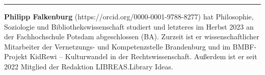 \begin{center}\rule{0.5\linewidth}{0.5pt}\end{center}

\textbf{Philipp Falkenburg} (https://orcid.org/0000-0001-9788-8277) hat
Philosophie, Soziologie und Bibliothekswissenschaft studiert und
letzteres im Herbst 2023 an der Fachhochschule Potsdam abgeschlossen
(BA). Zurzeit ist er wissenschaftlicher Mitarbeiter der Vernetzungs- und
Kompetenzstelle Brandenburg und im BMBF-Projekt KidRewi -- Kulturwandel
in der Rechtswissenschaft. Außerdem ist er seit 2022 Mitglied der
Redaktion LIBREAS.Library Ideas.
